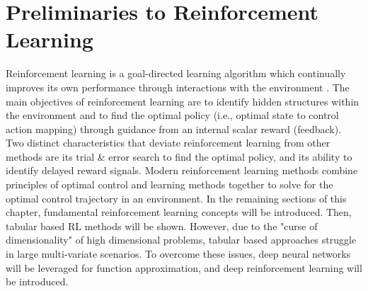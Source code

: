 
\section{Preliminaries to Reinforcement Learning}

Reinforcement learning is a goal-directed learning algorithm which continually improves its own performance through interactions with the environment \cite{sutton}. The main objectives of reinforcement learning are to identify hidden structures within the environment and to find the optimal policy (i.e., optimal state to control action mapping) through guidance from an internal scalar reward (feedback). Two distinct characteristics that deviate reinforcement learning from other methods are its trial \& error search to find the optimal policy, and its ability to identify delayed reward signals. Modern reinforcement learning methods combine principles of optimal control and learning methods together to solve for the optimal control trajectory in an environment.  In the remaining sections of this chapter, fundamental reinforcement learning concepts will be introduced.  Then, tabular based RL methods will be shown.  However, due to the "curse of dimensionality" of high dimensional problems, tabular based approaches struggle in large multi-variate scenarios.  To overcome these issues, deep neural networks will be leveraged for function approximation, and deep reinforcement learning will be introduced.

